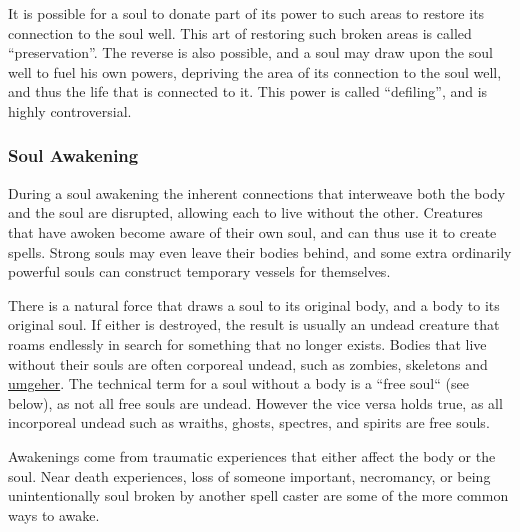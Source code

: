It is possible for a soul to donate part of its power to such areas to restore
its connection to the soul well. This art of restoring such broken areas is
called ``preservation''. The reverse is also possible, and a soul may draw
upon the soul well to fuel his own powers, depriving the area of its connection
to the soul well, and thus the life that is connected to it. This power is
called ``defiling'', and is highly controversial.


\subsubsection{Soul Awakening}
\label{sec:Soul Awakening}

During a soul awakening the inherent connections that interweave both the
body and the soul are disrupted, allowing each to live without the other.
Creatures that have awoken become aware of their own soul, and can thus use
it to create spells. Strong souls may even leave their bodies behind, and
some extra ordinarily powerful souls can construct temporary vessels for
themselves.

There is a natural force that draws a soul to its original body, and a body
to its original soul. If either is destroyed, the result is usually an
undead creature that roams endlessly in search for something that no longer
exists. Bodies that live without their souls are often corporeal undead,
such as zombies, skeletons and \hyperref[sec:Umgeher]{umgeher}. The
technical term for a soul without a body is a ``free soul`` (see below), as
not all free souls are undead. However the vice versa holds true, as all
incorporeal undead such as wraiths, ghosts, spectres, and spirits are free
souls.

Awakenings come from traumatic experiences that either affect the body or the
soul. Near death experiences, loss of someone important, necromancy, or being
unintentionally soul broken by another spell caster are some of the more
common ways to awake.

